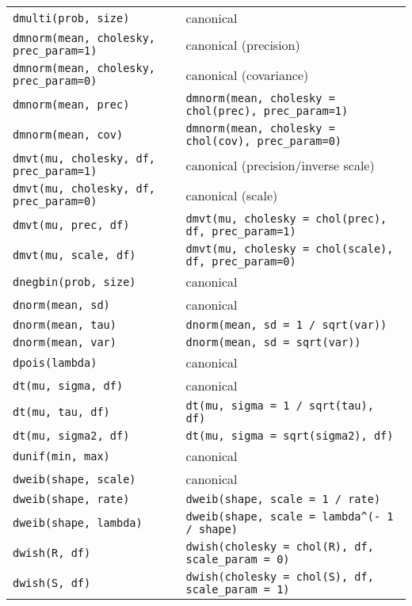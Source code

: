 \begin{center}
\begin{longtable}{ll}
     \texttt{dmulti(prob, size)} & canonical \\
     \texttt{dmnorm(mean, cholesky, prec\_param=1)} & canonical (precision) \\
     \texttt{dmnorm(mean, cholesky, prec\_param=0)} & canonical (covariance) \\
     \texttt{dmnorm(mean, prec)} & \texttt{dmnorm(mean, cholesky = chol(prec), prec\_param=1)} \\
     \texttt{dmnorm(mean, cov)} & \texttt{dmnorm(mean, cholesky = chol(cov), prec\_param=0)} \\
     \texttt{dmvt(mu, cholesky, df, prec\_param=1)} & canonical (precision/inverse scale) \\
     \texttt{dmvt(mu, cholesky, df, prec\_param=0)} & canonical (scale) \\
     \texttt{dmvt(mu, prec, df)} & \texttt{dmvt(mu, cholesky = chol(prec), df, prec\_param=1)} \\
     \texttt{dmvt(mu, scale, df)} & \texttt{dmvt(mu, cholesky = chol(scale), df, prec\_param=0)} \\
   \texttt{dnegbin(prob, size)} & canonical \\
     \texttt{dnorm(mean, sd)} & canonical \\
     \texttt{dnorm(mean, tau)} & \verb|dnorm(mean, sd = 1 / sqrt(var))| \\
     \texttt{dnorm(mean, var)} & \texttt{dnorm(mean, sd = sqrt(var))} \\
     \texttt{dpois(lambda)} & canonical \\
     \texttt{dt(mu, sigma, df)} & canonical \\
    \texttt{dt(mu, tau, df)} & \verb|dt(mu, sigma = 1 / sqrt(tau), df)| \\
    \texttt{dt(mu, sigma2, df)} & \verb|dt(mu, sigma = sqrt(sigma2), df)| \\
   \texttt{dunif(min, max)} & canonical \\
     \texttt{dweib(shape, scale)} & canonical \\
     \texttt{dweib(shape, rate)} & \verb|dweib(shape, scale = 1 / rate)| \\
     \texttt{dweib(shape, lambda)} & \verb|dweib(shape, scale = lambda^(- 1 / shape)| \\
     \texttt{dwish(R, df)} & \texttt{dwish(cholesky = chol(R), df, scale\_param = 0)}\\ 
     \texttt{dwish(S, df)} & \texttt{dwish(cholesky = chol(S), df, scale\_param = 1)}\\ 
     \end{longtable}
  \end{center}
